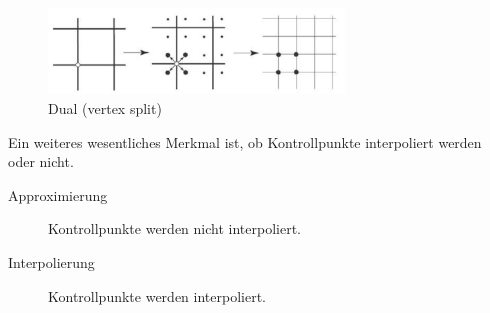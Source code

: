 \begin{figure}
  \centering
  \includegraphics[width=0.7\textwidth]{content/media/sd_dual}
  \caption{Dual (vertex split) \cite{Standford.24.07.2015}}
  \label{fig:sd_dual}
\end{figure}

Ein weiteres wesentliches Merkmal ist, ob Kontrollpunkte interpoliert werden oder nicht. 
\begin{description}
 \item[Approximierung] Kontrollpunkte werden nicht interpoliert.
 \item[Interpolierung] Kontrollpunkte werden interpoliert.
\end{description}

